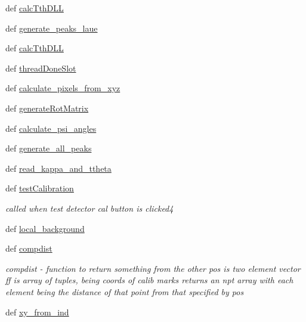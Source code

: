\begin{DoxyCompactItemize}
\item 
def \hyperlink{classmy_detector_1_1my_detector_ab1ec39dedf5ad3f5e49ecacd935632ee}{calc\-Tth\-D\-L\-L}
\item 
def \hyperlink{classmy_detector_1_1my_detector_afc52520eef732679f7ab195a0722a9e7}{generate\-\_\-peaks\-\_\-laue}
\item 
def \hyperlink{classmy_detector_1_1my_detector_ab1ec39dedf5ad3f5e49ecacd935632ee}{calc\-Tth\-D\-L\-L}
\item 
def \hyperlink{classmy_detector_1_1my_detector_ae6bc52229c1afb9e5f4d386f65436609}{thread\-Done\-Slot}
\item 
def \hyperlink{classmy_detector_1_1my_detector_a32e75eff3dbfa9bd7aa2c52c35dc5ed9}{calculate\-\_\-pixels\-\_\-from\-\_\-xyz}
\item 
def \hyperlink{classmy_detector_1_1my_detector_a6c37e75cc10b463055607b353c08906a}{generate\-Rot\-Matrix}
\item 
def \hyperlink{classmy_detector_1_1my_detector_ae044536621ae1d67732986d2786e89eb}{calculate\-\_\-psi\-\_\-angles}
\item 
def \hyperlink{classmy_detector_1_1my_detector_a4a11ce6f14f52e3cf63340d91dc819db}{generate\-\_\-all\-\_\-peaks}
\item 
def \hyperlink{classmy_detector_1_1my_detector_ae56669397e5b8160425c0043ce0bd10f}{read\-\_\-kappa\-\_\-and\-\_\-ttheta}
\item 
def \hyperlink{classmy_detector_1_1my_detector_aa07cdad98650ea99584f29742742c5c5}{test\-Calibration}
\begin{DoxyCompactList}\small\item\em called when test detector cal button is clicked4 \end{DoxyCompactList}\item 
def \hyperlink{classmy_detector_1_1my_detector_a770f58d5ad78d470084f5644ae55865c}{local\-\_\-background}
\item 
def \hyperlink{classmy_detector_1_1my_detector_a3870200120d08278f2f015534ca4557d}{compdist}
\begin{DoxyCompactList}\small\item\em compdist -\/ function to return something from the other pos is two element vector ff is array of tuples, being coords of calib marks returns an npt array with each element being the distance of that point from that specified by pos \end{DoxyCompactList}\item 
def \hyperlink{classmy_detector_1_1my_detector_aeef331d798559cfc9957b453c0db4f1d}{xy\-\_\-from\-\_\-ind}
\end{DoxyCompactItemize}
